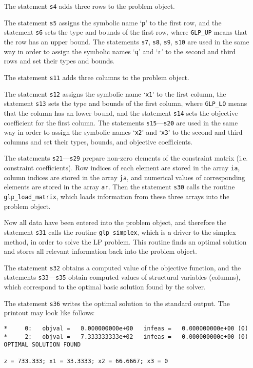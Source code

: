 The statement \verb|s4| adds three rows to the problem object.

The statement \verb|s5| assigns the symbolic name `\verb|p|' to the
first row, and the statement \verb|s6| sets the type and bounds of the
first row, where \verb|GLP_UP| means that the row has an upper bound.
The statements \verb|s7|, \verb|s8|, \verb|s9|, \verb|s10| are used in
the same way in order to assign the symbolic names `\verb|q|' and
`\verb|r|' to the second and third rows and set their types and bounds.

The statement \verb|s11| adds three columns to the problem object.

The statement \verb|s12| assigns the symbolic name `\verb|x1|' to the
first column, the statement \verb|s13| sets the type and bounds of the
first column, where \verb|GLP_LO| means that the column has an lower
bound, and the statement \verb|s14| sets the objective coefficient for
the first column. The statements \verb|s15|---\verb|s20| are used in
the same way in order to assign the symbolic names `\verb|x2|' and
`\verb|x3|' to the second and third columns and set their types,
bounds, and objective coefficients.

The statements \verb|s21|---\verb|s29| prepare non-zero elements of the
constraint matrix (i.e. constraint coefficients). Row indices of each
element are stored in the array \verb|ia|, column indices are stored in
the array \verb|ja|, and numerical values of corresponding elements are
stored in the array \verb|ar|. Then the statement \verb|s30| calls
the routine \verb|glp_load_matrix|, which loads information from these
three arrays into the problem object.

Now all data have been entered into the problem object, and therefore
the statement \verb|s31| calls the routine \verb|glp_simplex|, which is
a driver to the simplex method, in order to solve the LP problem. This
routine finds an optimal solution and stores all relevant information
back into the problem object.

The statement \verb|s32| obtains a computed value of the objective
function, and the statements \verb|s33|---\verb|s35| obtain computed
values of structural variables (columns), which correspond to the
optimal basic solution found by the solver.

The statement \verb|s36| writes the optimal solution to the standard
output. The printout may look like follows:

\begin{footnotesize}
\begin{verbatim}
*     0:   objval =   0.000000000e+00   infeas =   0.000000000e+00 (0)
*     2:   objval =   7.333333333e+02   infeas =   0.000000000e+00 (0)
OPTIMAL SOLUTION FOUND

z = 733.333; x1 = 33.3333; x2 = 66.6667; x3 = 0
\end{verbatim}
\end{footnotesize}

